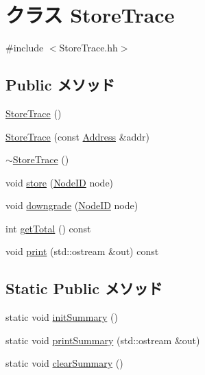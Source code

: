 \hypertarget{classStoreTrace}{
\section{クラス StoreTrace}
\label{classStoreTrace}
}


{\ttfamily \#include $<$StoreTrace.hh$>$}\subsection*{Public メソッド}
\begin{DoxyCompactItemize}
\item 
\hyperlink{classStoreTrace_a2427e5aea34e3e73f5ea3d160908a04f}{StoreTrace} ()
\item 
\hyperlink{classStoreTrace_a3b6cc83de0f940d009afe4e54906dc6f}{StoreTrace} (const \hyperlink{classAddress}{Address} \&addr)
\item 
\hyperlink{classStoreTrace_a63446b476732ad8bf7be15edff60afa5}{$\sim$StoreTrace} ()
\item 
void \hyperlink{classStoreTrace_a285a721b0b9f1a9e1ddde05a41056279}{store} (\hyperlink{TypeDefines_8hh_a83c14b4ae37e80071f6b3506a6c46151}{NodeID} node)
\item 
void \hyperlink{classStoreTrace_a4c38a560d4a5bbdfadc6d76975484b26}{downgrade} (\hyperlink{TypeDefines_8hh_a83c14b4ae37e80071f6b3506a6c46151}{NodeID} node)
\item 
int \hyperlink{classStoreTrace_af262952019c2e5f874224855cf7fb8bd}{getTotal} () const 
\item 
void \hyperlink{classStoreTrace_ac55fe386a101fbae38c716067c9966a0}{print} (std::ostream \&out) const 
\end{DoxyCompactItemize}
\subsection*{Static Public メソッド}
\begin{DoxyCompactItemize}
\item 
static void \hyperlink{classStoreTrace_aeb8b49a9925d3114c99e331d6be3e93b}{initSummary} ()
\item 
static void \hyperlink{classStoreTrace_a740ccf8997d1ac557ed59a8ef3f1f97d}{printSummary} (std::ostream \&out)
\item 
static void \hyperlink{classStoreTrace_a4fd1fa85dd3dbc5d630f99232dde1b3d}{clearSummary} ()
\end{DoxyCompactItemize}
